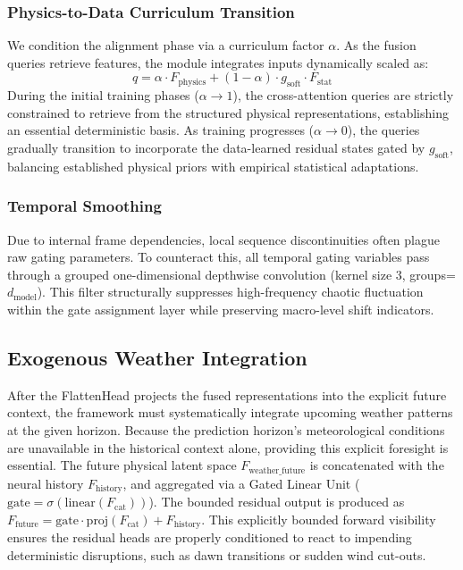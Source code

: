 \subsubsection{Physics-to-Data Curriculum Transition}
We condition the alignment phase via a curriculum factor $\alpha$. As the fusion queries retrieve features, the module integrates inputs dynamically scaled as:
\begin{equation}
    q = \alpha \cdot F_{\text{physics}} + (1 - \alpha) \cdot g_{\text{soft}} \cdot F_{\text{stat}}
\label{eq:curriculum_query}
\end{equation}
During the initial training phases ($\alpha \to 1$), the cross-attention queries are strictly constrained to retrieve from the structured physical representations, establishing an essential deterministic basis. As training progresses ($\alpha \to 0$), the queries gradually transition to incorporate the data-learned residual states gated by $g_{\text{soft}}$, balancing established physical priors with empirical statistical adaptations.

\subsubsection{Temporal Smoothing}
Due to internal frame dependencies, local sequence discontinuities often plague raw gating parameters. To counteract this, all temporal gating variables pass through a grouped one-dimensional depthwise convolution (kernel size $3$, groups=$d_{\text{model}}$). This filter structurally suppresses high-frequency chaotic fluctuation within the gate assignment layer while preserving macro-level shift indicators.

\subsection{Exogenous Weather Integration}
After the FlattenHead projects the fused representations into the explicit future context, the framework must systematically integrate upcoming weather patterns at the given horizon. Because the prediction horizon's meteorological conditions are unavailable in the historical context alone, providing this explicit foresight is essential. The future physical latent space $F_{\text{weather\_future}}$ is concatenated with the neural history $F_{\text{history}}$, and aggregated via a Gated Linear Unit ($\text{gate} = \sigma(\text{linear}(F_{\text{cat}}))$). The bounded residual output is produced as $F_{\text{future}} = \text{gate} \cdot \text{proj}(F_{\text{cat}}) + F_{\text{history}}$. This explicitly bounded forward visibility ensures the residual heads are properly conditioned to react to impending deterministic disruptions, such as dawn transitions or sudden wind cut-outs.

